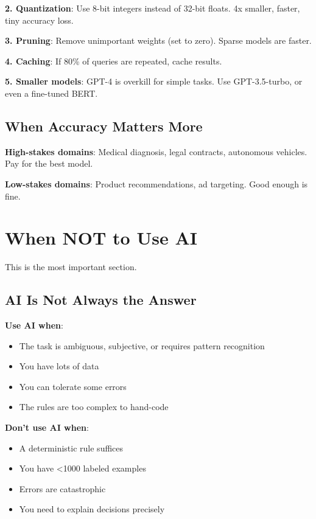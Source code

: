 \documentclass[11pt,oneside]{book}
\begin{document}
\textbf{2. Quantization}: Use 8-bit integers instead of 32-bit floats. 4x smaller, faster, tiny accuracy loss.

\textbf{3. Pruning}: Remove unimportant weights (set to zero). Sparse models are faster.

\textbf{4. Caching}: If 80\% of queries are repeated, cache results.

\textbf{5. Smaller models}: GPT-4 is overkill for simple tasks. Use GPT-3.5-turbo, or even a fine-tuned BERT.

\subsection{When Accuracy Matters More}

\textbf{High-stakes domains}: Medical diagnosis, legal contracts, autonomous vehicles. Pay for the best model.

\textbf{Low-stakes domains}: Product recommendations, ad targeting. Good enough is fine.

\section{When NOT to Use AI}

This is the most important section.

\subsection{AI Is Not Always the Answer}

\textbf{Use AI when}:
\begin{itemize}
\item The task is ambiguous, subjective, or requires pattern recognition
\item You have lots of data
\item You can tolerate some errors
\item The rules are too complex to hand-code
\end{itemize}

\textbf{Don't use AI when}:
\begin{itemize}
\item A deterministic rule suffices
\item You have <1000 labeled examples
\item Errors are catastrophic
\item You need to explain decisions precisely
\end{itemize}
\end{document}
